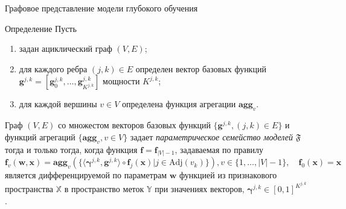 \documentclass[usenames,dvipsnames,11pt,pdf,utf8,russian,aspectratio=43]{beamer}
\begin{document}
\begin{frame}{Графовое представление модели глубокого обучения}
\footnotesize
\begin{block}{Определение}
Пусть
\begin{enumerate}
\item задан ациклический граф $(V,E)$;
\item для каждого ребра $(j,k) \in E$ определен вектор базовых функций  $\mathbf{g}^{j,k} = [\mathbf{g}^{j,k}_0, \dots, \mathbf{g}^{j,k}_{K^{j,k}}]$  мощности $K^{j,k}$;
\item для каждой вершины $v \in V$ определена функция агрегации $\textbf{agg}_v$.
\end{enumerate}
Граф $(V, E)$ со множестом векторов базовых функций $\{\mathbf{g}^{j,k}, (j,k) \in E\}$ и функций агрегаций $\{ \textbf{agg}_v, {v \in V}\}$ задает \textit{параметрическое семейство моделей} $\mathfrak{F}$ тогда и только тогда, когда функция $\mathbf{f} = \mathbf{f}_{|V|-1}$, задаваемая по правилу 
\begin{equation}
\label{eq:modelfam}
    \mathbf{f}_{v}(\mathbf{w}, \mathbf{x}) = \textbf{agg}_{v}\left(\{ \langle \boldsymbol{\gamma}^{j,k}, \mathbf{g}^{j,k} \rangle \circ  \mathbf{f}_j(\mathbf{x})| j \in \text{Adj}(v_k)\}\right), v \in \{1,\dots,|V|-1\}, \quad \mathbf{f}_0(\mathbf{x}) = \mathbf{x}
\end{equation}
является дифференцируемой  по параметрам $\mathbf{w}$ функцией из признакового пространства $\mathbb{X}$ в пространство меток $\mathbb{Y}$ при значениях векторов, $\boldsymbol{\gamma}^{j,k} \in [0,1]^{K^{j,k}}$.

\end{block}
\end{frame}

      
\end{document}
